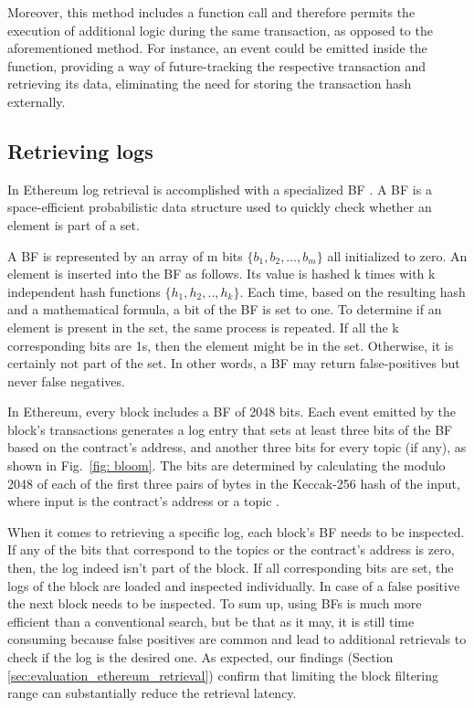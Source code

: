 Moreover, this method includes a function call and therefore permits the execution of additional logic during the same transaction, as opposed to the aforementioned method. For instance, an event could be emitted inside the function, providing a way of future-tracking the respective transaction and retrieving its data, eliminating the need for storing the transaction hash externally.

\subsection{Retrieving logs}\label{subsection:retrieving_logs}
In Ethereum log retrieval is accomplished with a specialized BF  \citep{wood_2014}. A BF  \citep{broder_2004} is a space-efficient probabilistic data structure used to quickly check whether an element is part of a set. 

A BF is represented by an array of m bits $\{b_1, b_2,…, b_m\}$ all initialized to zero. An element is inserted into the BF as follows. Its value is hashed k times with k independent hash functions $\{h_1, h_2,.., h_k\}$. Each time, based on the resulting hash and a mathematical formula, a bit of the BF is set to one. To determine if an element is present in the set, the same process is repeated. If all the k corresponding bits are 1s, then the element might be in the set. Otherwise, it is certainly not part of the set. In other words, a BF may return false-positives but never false negatives.

In Ethereum, every block includes a BF of 2048 bits. Each event emitted by the block’s transactions generates a log entry that sets at least three bits of the BF based on the contract’s address, and another three bits for every topic (if any), as shown in Fig.~\ref{fig: bloom}. The bits are determined by calculating the modulo 2048 of each of the first three pairs of bytes in the Keccak-256 hash of the input, where input is the contract’s address or a topic  \citep{wood_2014}.

When it comes to retrieving a specific log, each block’s BF needs to be inspected. If any of the bits that correspond to the topics or the contract’s address is zero, then, the log indeed isn’t part of the block. If all corresponding bits are set, the logs of the block are loaded and inspected individually. In case of a false positive the next block needs to be inspected.
To sum up, using BFs is much more efficient than a conventional search, but be that as it may, it is still time consuming because false positives are common and lead to additional retrievals to check if the log is the desired one. As expected, our findings (Section \ref{sec:evaluation_ethereum_retrieval}) confirm that limiting the block filtering range can substantially reduce the retrieval latency.

